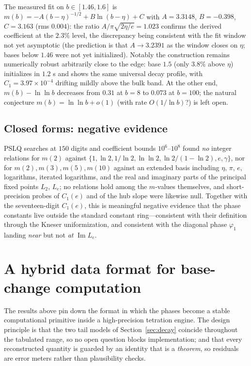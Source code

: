 \documentclass[11pt,a4paper]{article}
\theoremstyle{definition}
\theoremstyle{remark}
\begin{document}
The measured fit on $b\in[1.46,1.6]$ is
$m(b)=-A(b-\eta)^{-1/2}+B\ln(b-\eta)+C$ with $A=3.3148$, $B=-0.398$, $C=3.163$ (rms
$0.004$): the ratio $A/\pi\sqrt{2\eta/e}=1.023$ confirms the derived coefficient at the
$2.3\%$ level, the discrepancy being consistent with the fit window not yet asymptotic (the
prediction is that $A\to3.2391$ as the window closes on $\eta$; bases below $1.46$ were not
yet initialized). Notably the construction remains numerically robust arbitrarily close to
the edge: base $1.5$ (only $3.8\%$ above $\eta$) initializes in $1.2$ s and shows the same
universal decay profile, with $C_1=3.97\times10^{-4}$ drifting mildly above the bulk band.
At the other end, $m(b)-\ln\ln b$ decreases from $0.31$ at $b=8$ to $0.073$ at $b=100$; the
natural conjecture $m(b)=\ln\ln b+o(1)$ (with rate $O(1/\ln b)$?) is left open.

\subsection{Closed forms: negative evidence}

PSLQ searches at $150$ digits and coefficient bounds $10^6$--$10^8$ found \emph{no} integer
relations for $m(2)$ against $\{1,\ln2,1/\ln2,\ln\ln2,\ln2/(1-\ln2),e,\gamma\}$, nor for
$m(2),m(3),m(5),m(10)$ against an extended basis including $\eta$, $\pi$, $e$, logarithms,
iterated logarithms, and the real and imaginary parts of the principal fixed points $L_2$,
$L_e$; no relations hold among the $m$-values themselves, and short-precision probes of
$C_1(e)$ and of the hub slope were likewise null. Together with the seventeen-digit
$C_1(e)$, this is meaningful negative evidence that the phase constants live outside the
standard constant ring---consistent with their definition through the Kneser uniformization,
and consistent with the diagonal phase $\varphi_1$ landing \emph{near} but not \emph{at}
$\operatorname{Im}L_e$.

\section{A hybrid data format for base-change computation}\label{sec:format}

The results above pin down the format in which the phases become a stable computational
primitive inside a high-precision tetration engine. The design principle is that the two
tail models of Section~\ref{sec:decay} coincide throughout the tabulated range, so no open
question blocks implementation; and that every reconstructed quantity is guarded by an
identity that is a \emph{theorem}, so residuals are error meters rather than plausibility
checks.
\end{document}
